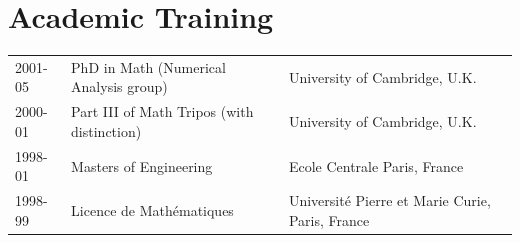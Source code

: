 \documentclass[11pt]{article}
\begin{document}
 



\section{Academic Training}
\begin{tabular}{lll}
2001-05 & PhD in Math (Numerical Analysis group) & \quad University of Cambridge, U.K.\\
2000-01 & Part III of Math Tripos (with distinction) & \quad University of Cambridge, U.K.\\
1998-01 & Masters of Engineering & \quad Ecole Centrale Paris, France\\   
1998-99 & Licence de Math\'{e}matiques & \quad Universit\'{e} Pierre et Marie Curie,  Paris, France\\
\end{tabular}  
\end{document}
